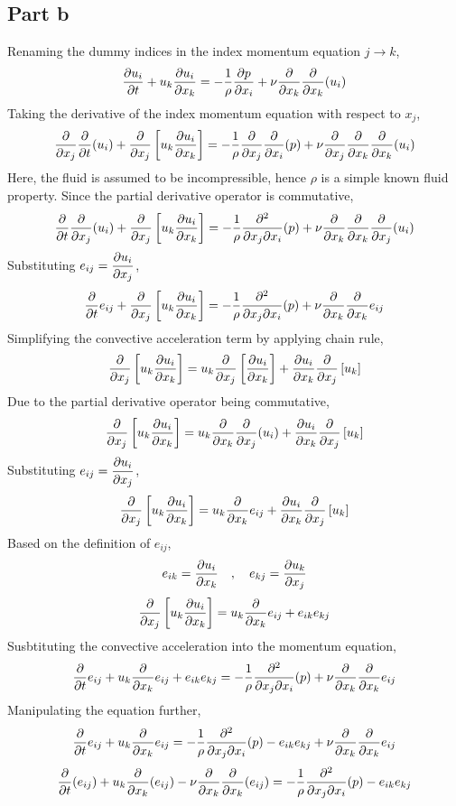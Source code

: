 \documentclass[class=report, 12pt, crop=false]{standalone}
\begin{document}
\begin{center}
\subsection{Part b}
\begin{comment}
\end{comment}
Renaming the dummy indices in the index momentum equation $j\to k$,
$$\frac{\partial u_i}{\partial t} + u_k\frac{\partial u_i}{\partial x_k} = -\frac{1}{\rho}\frac{\partial p}{\partial x_i} + \nu\frac{\partial}{\partial x_k}\frac{\partial}{\partial x_k}(u_i)$$
Taking the derivative of the index momentum equation with respect to $x_j$,
$$\frac{\partial}{\partial x_j}\frac{\partial}{\partial t}(u_i) + \frac{\partial}{\partial x_j}\left[u_k\frac{\partial u_i}{\partial x_k}\right] = -\frac{1}{\rho}\frac{\partial}{\partial x_j}\frac{\partial }{\partial x_i}(p) + \nu\frac{\partial}{\partial x_j}\frac{\partial}{\partial x_k}\frac{\partial}{\partial x_k}(u_i)$$
Here, the fluid is assumed to be incompressible, hence $\rho$ is a simple known fluid property. Since the partial derivative operator is commutative,
$$\frac{\partial}{\partial t}\frac{\partial}{\partial x_j}(u_i) + \frac{\partial}{\partial x_j}\left[u_k\frac{\partial u_i}{\partial x_k}\right] = -\frac{1}{\rho}\frac{\partial^2}{\partial x_j\partial x_i}(p) + \nu\frac{\partial}{\partial x_k}\frac{\partial}{\partial x_k}\frac{\partial}{\partial x_j}(u_i)$$
Substituting $\displaystyle{e_{ij}=\frac{\partial u_i}{\partial x_j}}$,
$$\frac{\partial}{\partial t}e_{ij} + \frac{\partial}{\partial x_j}\left[u_k\frac{\partial u_i}{\partial x_k}\right] = -\frac{1}{\rho}\frac{\partial^2}{\partial x_j\partial x_i}(p) + \nu\frac{\partial}{\partial x_k}\frac{\partial}{\partial x_k}e_{ij}$$
Simplifying the convective acceleration term by applying chain rule,
$$\frac{\partial}{\partial x_j}\left[u_k\frac{\partial u_i}{\partial x_k}\right] = u_k\frac{\partial}{\partial x_j}\left[\frac{\partial u_i}{\partial x_k}\right] + \frac{\partial u_i}{\partial x_k}\frac{\partial}{\partial x_j}\left[u_k\right]$$
Due to the partial derivative operator being commutative,
$$\frac{\partial}{\partial x_j}\left[u_k\frac{\partial u_i}{\partial x_k}\right] = u_k\frac{\partial }{\partial x_k}\frac{\partial}{\partial x_j}(u_i) + \frac{\partial u_i}{\partial x_k}\frac{\partial}{\partial x_j}\left[u_k\right]$$
Substituting $\displaystyle{e_{ij}=\frac{\partial u_i}{\partial x_j}}$,
$$\frac{\partial}{\partial x_j}\left[u_k\frac{\partial u_i}{\partial x_k}\right] = u_k\frac{\partial }{\partial x_k}e_{ij} + \frac{\partial u_i}{\partial x_k}\frac{\partial}{\partial x_j}\left[u_k\right]$$
Based on the definition of $e_{ij}$,
$$e_{ik} = \frac{\partial u_i}{\partial x_k} \quad,\quad e_{kj} = \frac{\partial u_k}{\partial x_j}$$
$$\frac{\partial}{\partial x_j}\left[u_k\frac{\partial u_i}{\partial x_k}\right] = u_k\frac{\partial }{\partial x_k}e_{ij} + e_{ik}e_{kj}$$
Susbtituting the convective acceleration into the momentum equation,
$$\frac{\partial}{\partial t}e_{ij} + u_k\frac{\partial }{\partial x_k}e_{ij} + e_{ik}e_{kj} = -\frac{1}{\rho}\frac{\partial^2}{\partial x_j\partial x_i}(p) + \nu\frac{\partial}{\partial x_k}\frac{\partial}{\partial x_k}e_{ij}$$
Manipulating the equation further,
$$\frac{\partial}{\partial t}e_{ij} + u_k\frac{\partial }{\partial x_k}e_{ij} = -\frac{1}{\rho}\frac{\partial^2}{\partial x_j\partial x_i}(p) - e_{ik}e_{kj} + \nu\frac{\partial}{\partial x_k}\frac{\partial}{\partial x_k}e_{ij}$$
$$\frac{\partial}{\partial t}(e_{ij}) + u_k\frac{\partial }{\partial x_k}(e_{ij}) - \nu\frac{\partial}{\partial x_k}\frac{\partial}{\partial x_k}(e_{ij}) = -\frac{1}{\rho}\frac{\partial^2}{\partial x_j\partial x_i}(p) - e_{ik}e_{kj}$$

\end{center}
\end{document}
